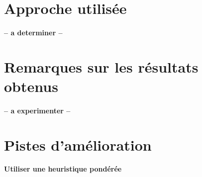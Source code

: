 \documentclass{scrreprt}
\begin{document}
    \section{Approche utilisée}

    \paragraph{-- a determiner --}

    \section{Remarques sur les résultats obtenus}

    \paragraph{-- a experimenter --}

    \section{Pistes d'amélioration}

    \paragraph{Utiliser une heuristique pondérée}
\end{document}
